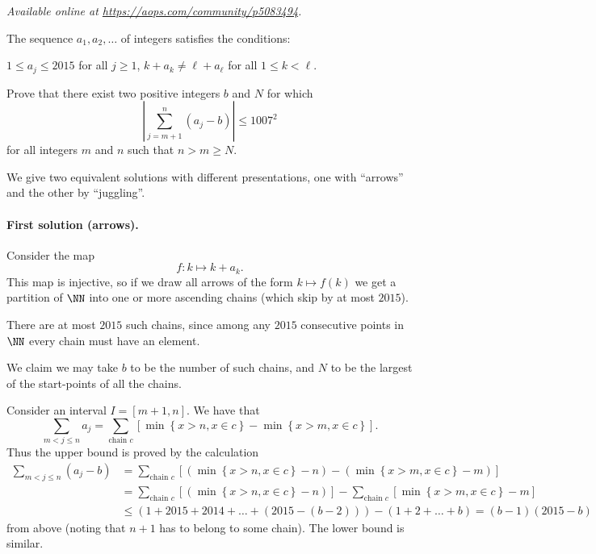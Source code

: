 
\textsl{Available online at \url{https://aops.com/community/p5083494}.}
\begin{mdframed}[style=mdpurplebox,frametitle={Problem statement}]
The sequence $a_1,a_2,\dots$ of integers satisfies the conditions:
\begin{enumerate}[(i)]
  \ii $1\le a_j\le2015$ for all $j\ge1$,
  \ii $k+a_k\neq \ell+a_\ell$ for all $1\le k<\ell$.
\end{enumerate}
Prove that there exist two positive integers $b$ and $N$ for which
\[ \left\lvert\sum_{j=m+1}^n (a_j-b) \right\rvert \le 1007^2 \]
for all integers $m$ and $n$ such that $n > m\ge N$.
\end{mdframed}
We give two equivalent solutions with different presentations,
one with ``arrows'' and the other by ``juggling''.

\paragraph{First solution (arrows).}
Consider the map
\[ f \colon k \mapsto k + a_k. \]
This map is injective, so if we draw all arrows of the form $k \mapsto f(k)$
we get a partition of $\NN$ into one or more ascending chains
(which skip by at most $2015$).

There are at most $2015$ such chains,
since among any $2015$ consecutive points in $\NN$
every chain must have an element.

We claim we may take $b$ to be the number of such chains,
and $N$ to be the largest of the start-points of all the chains.

Consider an interval $I = [m+1, n]$.
We have that
\[ \sum_{m<j\le n} a_j = \sum_{\text{chain } c} \left[ \min \left\{ x > n, x \in c \right\}
  - \min \left\{ x > m, x \in c \right\} \right]. \]
Thus the upper bound is proved by the calculation
\begin{align*}
  \sum_{m<j\le n} (a_j-b)
  &= \sum_{\text{chain } c} \left[ (\min \left\{ x > n, x \in c \right\} - n)
    - (\min \left\{ x > m, x \in c \right\} - m) \right] \\
  &= \sum_{\text{chain } c} \left[ (\min \left\{ x > n, x \in c \right\} - n) \right]
    - \sum_{\text{chain } c} \left[
    \min \left\{ x > m, x \in c \right\} - m \right] \\
  &\le (1+2015+2014+\dots+(2015-(b-2)))-(1+2+\dots+b) = (b-1)(2015-b)
\end{align*}
from above (noting that $n+1$ has to belong to some chain).
The lower bound is similar.

